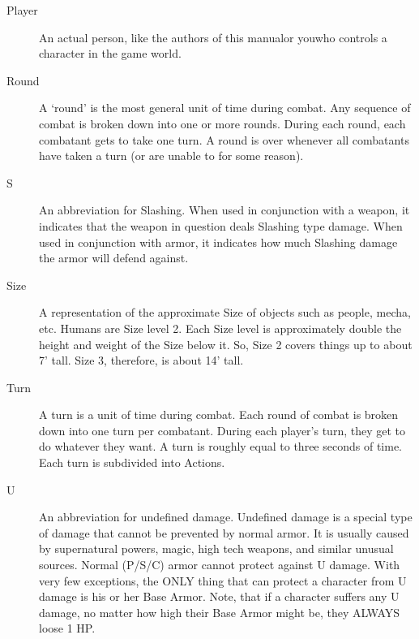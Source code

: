 \documentclass[twoside]{book}
\begin{document}
\begin{description}
  \item[ Player ]   An actual person, like the authors of this
                 manualor youwho controls a character in
                 the game world. 
  \item[ Round ]   A `round' is the most general unit of
                 time during combat. Any sequence of combat is broken
                 down into one or more rounds. During each round, each
                 combatant gets to take one turn. A round is over
                 whenever all combatants have taken a turn (or are unable
                 to for some reason). 
  \item[ S ]   An abbreviation for Slashing. When used in
                 conjunction with a weapon, it indicates that the weapon
                 in question deals Slashing type damage. When used in
                 conjunction with armor, it indicates how much Slashing
                 damage the armor will defend against. 
  \item[ Size ]   A representation of the approximate Size of
                 objects such as people, mecha, etc. Humans are Size
                 level 2. Each Size level is approximately double the
                 height and weight of the Size below it. So, Size 2
                 covers things up to about 7' tall. Size 3,
                 therefore, is about 14' tall. 
  \item[ Turn ]   A turn is a unit of time during combat. Each
                 round of combat is broken down into one turn per
                 combatant. During each player's turn, they get to
                 do whatever they want. A turn is roughly equal to three
                 seconds of time. Each turn is subdivided into Actions.
                 
  \item[ U ]   An abbreviation for undefined damage. Undefined
                 damage is a special type of damage that cannot be
                 prevented by normal armor. It is usually caused by
                 supernatural powers, magic, high tech weapons, and
                 similar unusual sources. Normal (P/S/C) armor cannot
                 protect against U damage. With very few exceptions, the
                 ONLY thing that can protect a character from U damage is
                 his or her Base Armor. Note, that if a character suffers
                 any U damage, no matter how high their Base Armor might
                 be, they ALWAYS loose 1 HP. 
\end{description}
  
\end{document}
